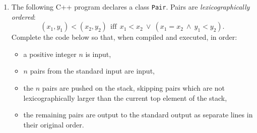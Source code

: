 \documentclass[a4paper,12pt]{article}
\begin{document}
\begin{enumerate}
{\begin{figure}[!htb]
\caption{\label{fig:nodes-solution} Doubly linked list being rearranged}
\end{figure}


{\bf Note:} We cannot simply reassign {\tt info} fields, since they are constant and do not change over the lifetime of the nodes.
There are some other situations when it is easier to leave the pointers as they are, but swap the contents of 
the {\tt info} fields.
}


\clearpage

\item \label{q:q4}

The following C++ program declares a class {\tt Pair}. 
Pairs are {\em lexicographically ordered}: 
\[
(x_1, y_1) < (x_2, y_2)\ \ \text{iff}\ \ x_1 < x_2\ \vee\ (x_1 = x_2\ \wedge\ y_1 < y_2).
\]
Complete the code below so that, when compiled and executed, in order:
\begin{itemize}
\item a positive integer $n$ is input,
\item $n$ pairs from the standard input are input,
\item the $n$ pairs are pushed on the stack, skipping pairs which are not lexicographically larger than the current top element of the stack,
\item the remaining pairs are output to the standard output as separate lines in their original order.
\end{itemize}


\end{enumerate}
\end{document}
